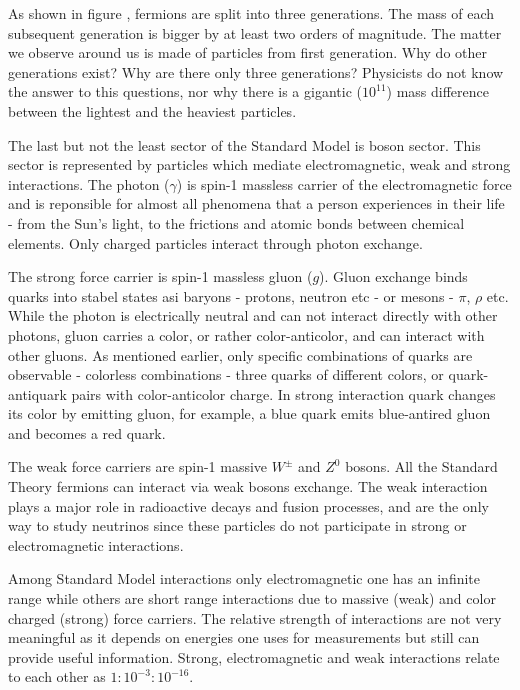 As shown in figure , fermions are split into three generations. The mass of each 
subsequent generation is bigger by at least two orders of magnitude. The matter we observe 
around us is made of particles from first generation. Why do other generations exist? Why are
there only three generations? Physicists do not know the answer to this questions, nor 
why there is a gigantic ($10^{11}$) mass difference between the lightest and the heaviest particles. 

The last but not the least sector of the Standard Model is boson sector. This sector is 
represented by particles which mediate electromagnetic, weak and strong interactions. The photon
($\gamma$) is spin-1 massless carrier of the electromagnetic force and is reponsible for almost all phenomena 
that a person experiences in their life - from the Sun's light, to the frictions and atomic bonds between 
chemical elements. Only charged particles interact through photon exchange.

The strong force carrier is spin-1 massless gluon ($g$). Gluon exchange binds quarks into stabel states asi
baryons - protons, neutron etc - or mesons - $\pi$, $\rho$ etc. While the photon is electrically
neutral and can not interact directly with other photons, gluon carries a color, or
rather color-anticolor, and can interact with other gluons. As mentioned earlier, only specific 
combinations of quarks are observable - colorless combinations - three quarks of different colors,
or quark-antiquark pairs with color-anticolor charge. In strong interaction quark changes its color
by emitting gluon, for example, a blue quark emits blue-antired gluon and becomes a red quark.

The weak force carriers are spin-1 massive $W^\pm$ and $Z^0$ bosons. All the Standard Theory fermions 
can interact via weak bosons exchange. The weak interaction plays a major role in radioactive decays and 
fusion processes, and are the only way to study neutrinos since these particles do not participate in strong or
electromagnetic interactions.

Among Standard Model interactions only electromagnetic one has an infinite range while others
are short range interactions due to massive (weak) and color charged (strong) force carriers. 
The relative strength of interactions are not very meaningful as it depends on energies one uses
for measurements but still can provide useful information. Strong, electromagnetic and weak interactions
relate to each other as $1:10^{-3}:10^{-16}$.


